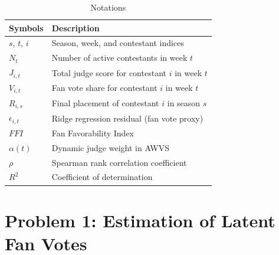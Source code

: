 \documentclass{mcmthesis}
\begin{document}
\begin{table}[H]
\centering
\caption{Notations}
\begin{tabular}{p{3.5cm}p{9cm}}
\toprule
\centering Symbols & \centering Description \arraybackslash \\
\midrule
\centering $s$, $t$, $i$ & \centering Season, week, and contestant indices \arraybackslash \\
\centering $N_t$ & \centering Number of active contestants in week $t$ \arraybackslash \\
\centering $J_{i,t}$ & \centering Total judge score for contestant $i$ in week $t$ \arraybackslash \\
\centering $V_{i,t}$ & \centering Fan vote share for contestant $i$ in week $t$ \arraybackslash \\
\centering $R_{i,s}$ & \centering Final placement of contestant $i$ in season $s$ \arraybackslash \\
\centering $\epsilon_{i,t}$ & \centering Ridge regression residual (fan vote proxy) \arraybackslash \\
\centering $FFI$ & \centering Fan Favorability Index \arraybackslash \\
\centering $\alpha(t)$ & \centering Dynamic judge weight in AWVS \arraybackslash \\
\centering $\rho$ & \centering Spearman rank correlation coefficient \arraybackslash \\
\centering $R^2$ & \centering Coefficient of determination \arraybackslash \\
\bottomrule
\end{tabular}
\end{table}

\section{Problem 1: Estimation of Latent Fan Votes}
\end{document}

